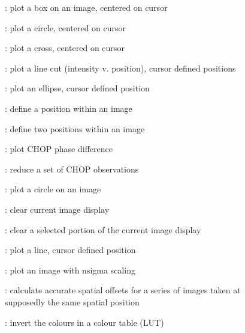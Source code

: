 \begin{description}
\item []: plot a box on an image, centered on cursor

\item []: plot a circle, centered on cursor

\item []: plot a cross, centered on cursor

\item []: plot a line cut (intensity v. position),
cursor defined positions

\item []: plot an ellipse, cursor defined position

\item []: define a position within an image

\item []: define two positions within an image

\item []: plot CHOP phase difference

\item []: reduce a set of CHOP observations

\item []: plot a circle on an image

\item []: clear current image display

\item []: clear a selected portion of the
current image display

\item []: plot a line, cursor defined position

\item []: plot an image with nsigma scaling

\item []: calculate accurate spatial offsets for a
series of images taken at supposedly the same spatial position

\item []:  invert the colours in a colour table (LUT)



\end{description}
